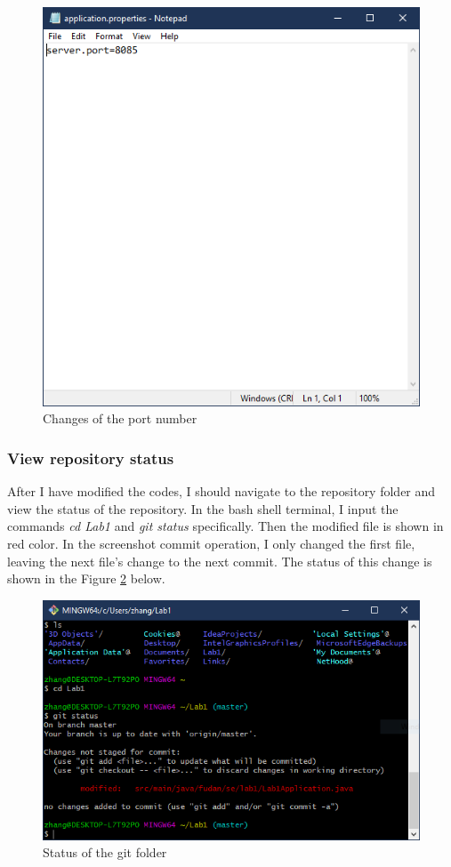 \documentclass[a4paper]{report}
\begin{document}
\begin{figure}
  \centering
  \includegraphics[width=12cm]{Figures/Capture3.png}
  \caption{Changes of the port number}\label{3}
\end{figure}
\subsubsection{View repository status}
After I have modified the codes, I should navigate to the repository folder and view the status of the repository. In the bash shell terminal, I input the commands \emph{cd Lab1} and \emph{git status} specifically. Then the modified file is shown in red color. In the screenshot commit operation, I only changed the first file, leaving the next file's change to the next commit. The status of this change is shown in the Figure \ref{4} below.
\begin{figure}
  \centering
  \includegraphics[width=12cm]{Figures/Capture1.png}
  \caption{Status of the git folder}\label{4}
\end{figure}
\end{document}
